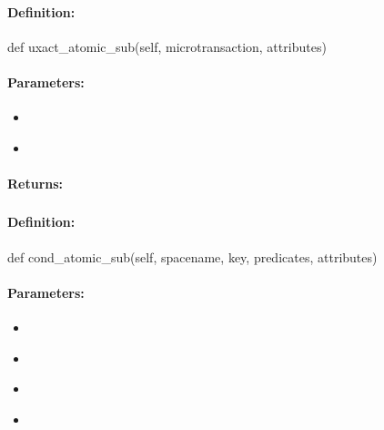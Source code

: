 \paragraph{Definition:}
\begin{pythoncode}
def uxact_atomic_sub(self, microtransaction, attributes)
\end{pythoncode}

\paragraph{Parameters:}
\begin{itemize}[noitemsep]
\item {}\\

\item {}\\

\end{itemize}

\paragraph{Returns:}


\pagebreak
\subsubsection{}
\label{api:python:cond_atomic_sub}


\paragraph{Definition:}
\begin{pythoncode}
def cond_atomic_sub(self, spacename, key, predicates, attributes)
\end{pythoncode}

\paragraph{Parameters:}
\begin{itemize}[noitemsep]
\item {}\\

\item {}\\

\item {}\\

\item {}\\

\end{itemize}

